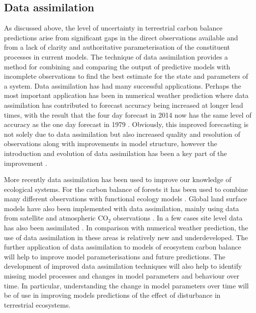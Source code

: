 \subsection{Data assimilation}


As discussed above, the level of uncertainty in terrestrial carbon balance predictions arise from significant gaps in the direct observations available and from a lack of clarity and authoritative parameterisation of the constituent processes in current models. The technique of data assimilation provides a method for combining and comparing the output of predictive models with incomplete observations to find the best estimate for the state and parameters of a system. Data assimilation has had many successful applications. Perhaps the most important application has been in numerical weather prediction where data assimilation has contributed to forecast accuracy being increased at longer lead times, with the result that the four day forecast in 2014 now has the same level of accuracy as the one day forecast in 1979 \citep{bauer2015quiet}. Obviously, this improved forecasting is not solely due to data assimilation but also increased quality and resolution of observations along with improvements in model structure, however the introduction and evolution of data assimilation has been a key part of the improvement \citep{dee2011era}.

More recently data assimilation has been used to improve our knowledge of ecological systems. For the carbon balance of forests it has been used to combine many different observations with functional ecology models \citep{zobitz2011primer, fox2009reflex, richardson2010estimating, Quaife2008, Zobitz2014, Niu2014}. Global land surface models have also been implemented with data assimilation, mainly using data from satellite and atmospheric $\text{CO}_{2}$ observations \citep{Kaminski2013, scholze2007propagating}. In a few cases site level data has also been assimilated \citep{Verbeeck2011, Bacour2015}. In comparison with numerical weather prediction, the use of data assimilation in these areas is relatively new and underdeveloped. The further application of data assimilation to models of ecosystem carbon balance will help to improve model parameterisations and future predictions. The development of improved data assimilation techniques will also help to  identify missing model processes and changes in model parameters and behaviour over time. In particular, understanding the change in model parameters over time will be of use in improving models predictions of the effect of disturbance in terrestrial ecosystems.
  
